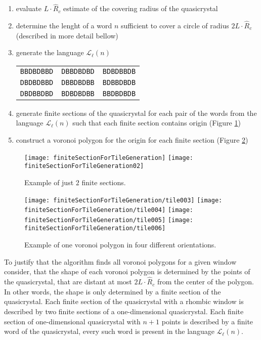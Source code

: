 \documentclass[text.tex]{subfiles}
\begin{document}
\begin{enumerate}
\item evaluate $L\cdot\hat{R}_c$ estimate of the covering radius of the quasicrystal
\item determine the lenght of a word $n$ sufficient to cover a circle of radius $2L\cdot\hat{R}_c$ (described in more detail bellow)
\item generate the language $\mathcal{L}_{\ell}(n)$

\begin{tabular}{ccc}
\texttt{BBDBDBBD} & \texttt{DBBDBDBD} & \texttt{BDBDBBDB} \\
\texttt{DBDBDBBD} & \texttt{DBBDBDBB} & \texttt{BDBBDBDB} \\
\texttt{DBDBBDBD} & \texttt{BDBDBDBB} & \texttt{BBDBDBDB} \\
\end{tabular}
\item generate finite sections of the quasicrystal for each pair of the words from the language $\mathcal{L}_{\ell}(n)$ such that each finite section contains origin (Figure \ref{fig:finiteSectionForTileGeneration})
\item construct a voronoi polygon for the origin for each finite section (Figure \ref{fig:finiteSectionForTileGeneration:more})
\end{enumerate}

\begin{figure}[h]
\centering
\texttt{[image: finiteSectionForTileGeneration]}
\texttt{[image: finiteSectionForTileGeneration02]}
\caption{Example of just $2$ finite sections.}
\label{fig:finiteSectionForTileGeneration}
\end{figure}

\begin{figure}[h]
\centering
\texttt{[image: finiteSectionForTileGeneration/tile003]}
\texttt{[image: finiteSectionForTileGeneration/tile004]}
\texttt{[image: finiteSectionForTileGeneration/tile005]}
\texttt{[image: finiteSectionForTileGeneration/tile006]}
\caption{Example of one voronoi polygon in four different orientations.}
\label{fig:finiteSectionForTileGeneration:more}
\end{figure}

To justify that the algorithm finds all voronoi polygons for a given window consider, that the shape of each voronoi polygon is determined by the points of the quasicrystal, that are distant at most $2L\cdot\hat{R}_c$ from the center of the polygon. In other words, the shape is only determined by a finite section of the quasicrystal. Each finite section of the quasicrystal with a rhombic window is described by two finite sections of a one-dimensional quasicrystal. Each finite section of one-dimensional quasicrystal with $n+1$ points is described by a finite word of the quasicrystal, every such word is present in the language $\mathcal{L}_{\ell}(n)$.
\end{document}
